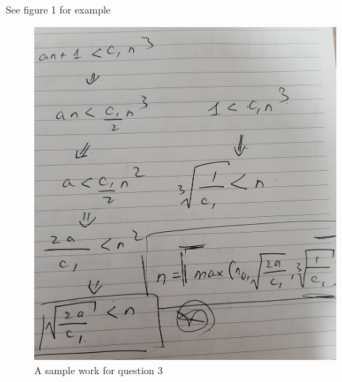 \documentclass[12pt]{article}
\begin{document}
\begin{itemize}
\begin{itemize}
        \bigskip

        See figure 1 for example

        \begin{figure}
            \includegraphics[width=\linewidth]{images/midterm_1_v1_q3_comment.jpg}
            \caption{A sample work for question 3}
        \end{figure}
    \end{itemize}
\end{itemize}

\newpage
\end{document}
